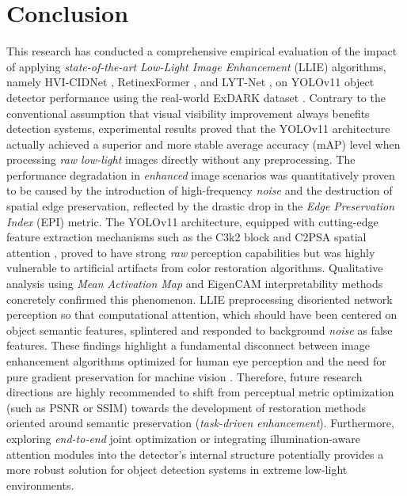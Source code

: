 \documentclass[conference]{IEEEtran}
\begin{document}
\section{Conclusion}
This research has conducted a comprehensive empirical evaluation of the impact of applying \textit{state-of-the-art} \textit{Low-Light Image Enhancement} (LLIE) algorithms, namely HVI-CIDNet \cite{yan2025hvi}, RetinexFormer \cite{cai2023retinexformer}, and LYT-Net \cite{brateanu2025lytnet}, on YOLOv11 object detector performance using the real-world ExDARK dataset \cite{loh2019exdark}. Contrary to the conventional assumption that visual visibility improvement always benefits detection systems, experimental results proved that the YOLOv11 architecture actually achieved a superior and more stable average accuracy (mAP) level when processing \textit{raw low-light} images directly without any preprocessing.
The performance degradation in \textit{enhanced} image scenarios was quantitatively proven to be caused by the introduction of high-frequency \textit{noise} and the destruction of spatial edge preservation, reflected by the drastic drop in the \textit{Edge Preservation Index} (EPI) metric. The YOLOv11 architecture, equipped with cutting-edge feature extraction mechanisms such as the C3k2 block and C2PSA spatial attention \cite{khanam2024yolov11}, proved to have strong \textit{raw} perception capabilities but was highly vulnerable to artificial artifacts from color restoration algorithms. Qualitative analysis using \textit{Mean Activation Map} and EigenCAM interpretability methods \cite{metrics2026formulas} concretely confirmed this phenomenon. LLIE preprocessing disoriented network perception so that computational attention, which should have been centered on object semantic features, splintered and responded to background \textit{noise} as false features.
These findings highlight a fundamental disconnect between image enhancement algorithms optimized for human eye perception and the need for pure gradient preservation for machine vision \cite{wu2024llieeffect}. Therefore, future research directions are highly recommended to shift from perceptual metric optimization (such as PSNR or SSIM) towards the development of restoration methods oriented around semantic preservation (\textit{task-driven enhancement}). Furthermore, exploring \textit{end-to-end} joint optimization or integrating illumination-aware attention modules into the detector's internal structure potentially provides a more robust solution for object detection systems in extreme low-light environments.


\end{document}
